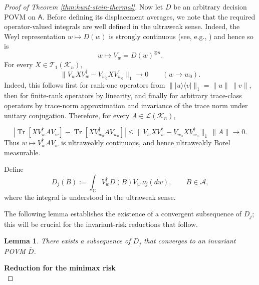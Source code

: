 \documentclass{article}
\newtheorem{lemma}[theorem]{Lemma}
\theoremstyle{named}
\theoremstyle{named1}
\newcommand{\Tr}{\operatorname{Tr}}
\newcommand{\bbC}{\mathbb C}
\theoremstyle{plain}
\theoremstyle{remark}
\begin{document}
\begin{proof}[Proof of Theorem \ref{thm:hunt-stein-thermal}]
Now let $D$ be an arbitrary decision POVM on $\mathsf A$.
Before defining its displacement averages, we note that the required
operator-valued integrals are well defined in the ultraweak sense.
Indeed, the Weyl representation $w\mapsto D(w)$ is strongly continuous
(see, e.g., \cite[Chapter~1, \S1.3]{Folland1989})
and hence so is
\[
    w\mapsto V_w=D(w)^{\otimes n}.
\]
For every $X\in\mathcal T_1(\mathcal K_n)$,
\[
    \|V_wXV_w^\dagger-V_{w_0}XV_{w_0}^\dagger\|_1
    \rightarrow0
    \qquad (w\to w_0).
\]
Indeed, this follows first for rank-one operators from
$\||u\rangle\langle v|\|_1=\|u\|\,\|v\|$, then for finite-rank
operators by linearity, and finally for arbitrary trace-class operators
by trace-norm approximation and invariance of the trace norm under
unitary conjugation. Therefore, for every
$A\in\mathcal L(\mathcal K_n)$,

\[
\left|
    \Tr[XV_w^\dagger A V_w]
    -
    \Tr[XV_{w_0}^\dagger A V_{w_0}]
\right| \leq
\|V_wXV_w^\dagger-V_{w_0}XV_{w_0}^\dagger\|_1\,\|A\|
\rightarrow0.
\]
Thus $w\mapsto V_w^\dagger A V_w$ is ultraweakly continuous, and hence
ultraweakly Borel measurable.

Define
\begin{equation}
    D_j(B)
    :=
    \int_{\bbC}
        V_w^\dagger D(B)V_w\,\nu_j(dw),
    \qquad
    B\in\mathcal A,
    \label{eq:asymptotically-averaged-povm}
\end{equation}
where the integral is understood in the ultraweak sense.

The following lemma establishes the existence of a convergent subsequence of $D_{j}$; this will be crucial for the invariant-risk reductions that follow.

\begin{lemma}\label{seq_conv_POVM}
There exists a subsequence of $D_j$ that converges to an invariant POVM $\bar{D}$.
\end{lemma}



\medskip
\noindent
\textbf{Reduction for the minimax risk}\\
\medskip
\noindent


\end{proof}
\end{document}
